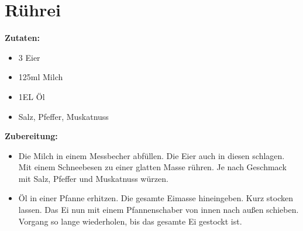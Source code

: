 \section{Rührei}

\textbf{Zutaten:}
\begin{itemize}
  \item 3 Eier
  \item 125ml Milch
  \item 1EL Öl
  \item Salz, Pfeffer, Muskatnuss
\end{itemize}

\textbf{Zubereitung:}
\begin{itemize}
  \item Die Milch in einem Messbecher abfüllen. Die Eier auch in diesen schlagen. Mit einem Schneebesen zu einer glatten Masse rühren. Je nach Geschmack mit Salz, Pfeffer und Muskatnuss würzen.
  \item Öl in einer Pfanne erhitzen. Die gesamte Eimasse hineingeben. Kurz stocken lassen. Das Ei nun mit einem Pfannenschaber von innen nach außen schieben. Vorgang so lange wiederholen, bis das gesamte Ei gestockt ist.
\end{itemize}
